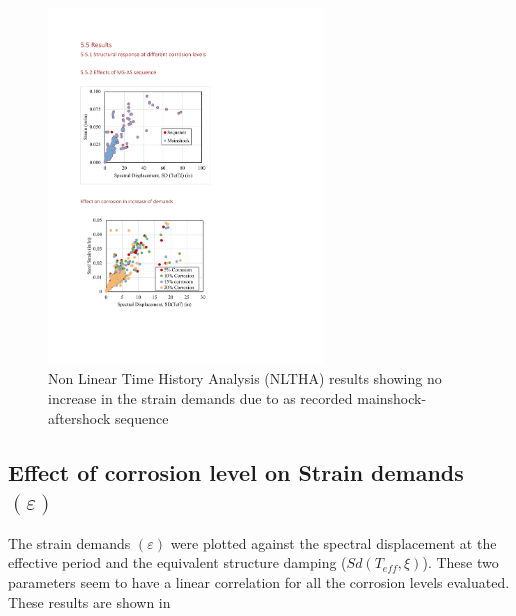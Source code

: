 \begin{figure}[htbp]
	\centering
	\includegraphics[width=0.65\textwidth]{VAC Thesis 2.0/Chapter-5/figs/MS_AS_results_noincrease_in_demands.pdf}
	\caption{Non Linear Time History Analysis (NLTHA) results showing no increase in the strain demands due to as recorded mainshock-aftershock sequence}
	\label{fig:ms_as_results}
\end{figure}

\subsection{Effect of corrosion level on Strain demands $(\varepsilon)$}

The strain demands $(\varepsilon)$ were plotted against the spectral displacement at the effective period and the equivalent structure damping ($Sd(T_{eff},\xi)$). These two parameters seem to have a linear correlation for all the corrosion levels evaluated. These results are shown in 

